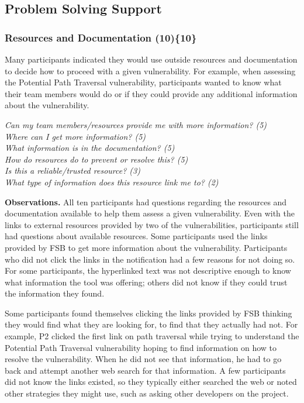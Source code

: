 \documentclass{acm_proc_article-sp}
\begin{document}
\subsection{Problem Solving Support}
\label{sec:results-pss}



\subsubsection{\textbf{Resources and Documentation (10)\{10\}}}\label{rd}

Many participants indicated they would use outside resources and documentation to decide how to proceed with a given vulnerability.
For example, when assessing the Potential Path Traversal vulnerability, participants wanted to know what their team members would do or if they could provide any additional information about the vulnerability. 


\noindent\emph{Can my team members/resources provide me with more information? (5)} \\
\emph{Where can I get more information? (5)} \\
\emph{What information is in the documentation? (5)} \\
\emph{How do resources do to prevent or resolve this? (5)} \\
\emph{Is this a reliable/trusted resource? (3)} \\
\emph{What type of information does this resource link me to? (2)}



\noindent\textbf{Observations.}
All ten participants had questions regarding the resources and documentation available to help them assess a given vulnerability. 
Even with the links to external resources provided by two of the vulnerabilities, participants still had questions about available resources. 
Some participants used the links provided by FSB to get more information about the vulnerability.
Participants who did not click the links in the notification had a few reasons for not doing so.
For some participants, the hyperlinked text was not descriptive enough to know what information the tool was offering; others did not know if they could trust the information they found.

Some participants found themselves clicking the links provided by FSB thinking they would find what they are looking for, to find that they actually had not. 
For example, P2 clicked the first link on path traversal while trying to understand the Potential Path Traversal vulnerability hoping to find information on how to resolve the vulnerability.
When he did not see that information, he had to go back and attempt another web search for that information. 
A few participants did not know the links existed, so they typically either searched the web or noted other strategies they might use, such as asking other developers on the project.
\end{document}

